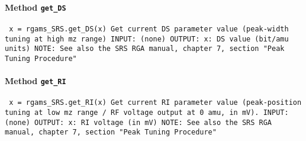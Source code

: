 \paragraph{Method \texttt{get_DS}}
\vspace{1ex}
\texttt{\newline
x = rgams_SRS.get_DS(x)\newline
\newline
Get current DS parameter value (peak-width tuning at high mz range)\newline
\newline
INPUT:\newline
(none)\newline
\newline
OUTPUT:\newline
x: DS value (bit/amu units)\newline
\newline
NOTE:\newline
See also the SRS RGA manual, chapter 7, section "Peak Tuning Procedure"\newline
\newline
}

\paragraph{Method \texttt{get_RI}}
\vspace{1ex}
\texttt{\newline
x = rgams_SRS.get_RI(x)\newline
\newline
Get current RI parameter value (peak-position tuning at low mz range / RF voltage output at 0 amu, in mV).\newline
\newline
INPUT:\newline
(none)\newline
\newline
OUTPUT:\newline
x: RI voltage (in mV)\newline
\newline
NOTE:\newline
See also the SRS RGA manual, chapter 7, section "Peak Tuning Procedure"\newline
\newline
}

